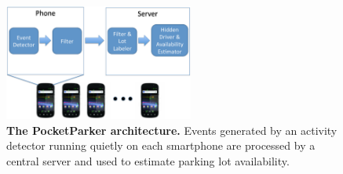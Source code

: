 \begin{figure}
\centering
\includegraphics[height=1.5in]{./figures/blockdiagram.pdf}

\caption{\textbf{The PocketParker architecture.} Events generated by an
activity detector running quietly on each smartphone are processed by a
central server and used to estimate parking lot availability.}

\label{fig-arch}
\vspace*{-0.2in}
\end{figure}
